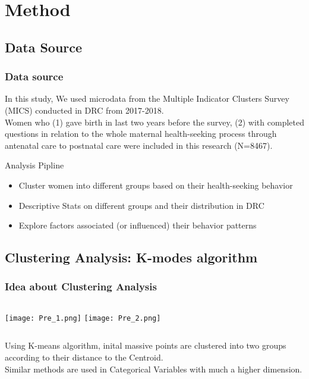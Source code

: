 \documentclass[13pt]{beamer}
\begin{document}
\section{Method}

\subsection{Data Source}
\begin{frame}
	\frametitle{Data source}
	In this study, We used microdata from the Multiple Indicator Clusters Survey (MICS) conducted in DRC from 2017-2018.\\
	Women who (1) gave birth in last two years before the survey, (2) with completed questions in relation to the whole maternal health-seeking process through antenatal care to postnatal care were included in this research (N=8467).\\
	\begin{block}{Analysis Pipline}
		\begin{itemize}
			\item Cluster women into different groups based on their health-seeking behavior
			\item Descriptive Stats on different groups and their distribution in DRC
			\item Explore factors associated (or influenced) their behavior patterns
		\end{itemize}
	\end{block}
\end{frame}
\subsection{Clustering Analysis: K-modes algorithm}
\begin{frame}
	\frametitle{Idea about Clustering Analysis}
	   \begin{columns}
	   	\centering
	   	\texttt{[image: Pre\_1.png]}
	   	\centering
	   	\texttt{[image: Pre\_2.png]}
	  \end{columns}
  Using K-means algorithm, inital massive points are clustered into  two groups according to their distance to the Centroid.\\
  Similar methods are used in Categorical Variables with much a higher dimension.
\end{frame}
\end{document}
